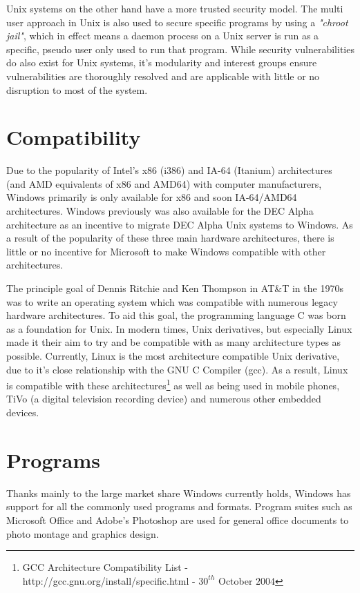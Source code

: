 \documentclass[a4paper,12pt]{article}
\begin{document}
Unix systems on the other hand have a more trusted security model. The
multi user approach in Unix is also used to secure specific programs by
using a \emph{"chroot jail"}, which in effect means a daemon process on a
Unix server is run as a specific, pseudo user only used to run that
program. While security vulnerabilities do also exist for Unix systems,
it's modularity and interest groups ensure vulnerabilities are
thoroughly resolved and are applicable with little or no disruption to
most of the system.

\section*{Compatibility}

Due to the popularity of Intel's x86 (i386) and IA-64 (Itanium)
architectures (and AMD equivalents of x86 and AMD64) with computer 
manufacturers, Windows primarily is only available for x86 and soon
IA-64/AMD64 architectures. Windows previously was also available for
the DEC Alpha architecture as an incentive to migrate DEC Alpha Unix
systems to Windows. As a result of the popularity of these three main 
hardware architectures, there is little or no incentive for Microsoft to
make Windows compatible with other architectures.

The principle goal of Dennis Ritchie and Ken Thompson in AT\&T in the
1970s was to write an operating system which was compatible with
numerous legacy hardware architectures. To aid this goal, the
programming language C was born as a foundation for Unix. In modern times,
Unix derivatives, but especially Linux made it their aim to try and be
compatible with as many architecture types as possible. Currently, Linux
is the most architecture compatible Unix derivative, due to it's close
relationship with the GNU C Compiler (gcc). As a result, Linux is
compatible with these architectures\footnote{GCC Architecture
Compatibility List - http://gcc.gnu.org/install/specific.html - $30^{th}$
October $2004$} as well as being used in mobile phones, TiVo (a digital
television recording device) and numerous other embedded devices.

\section*{Programs}

Thanks mainly to the large market share Windows currently holds, Windows
has support for all the commonly used programs and formats. Program
suites such as Microsoft Office and Adobe's Photoshop are used for
general office documents to photo montage and graphics design.
\end{document}
